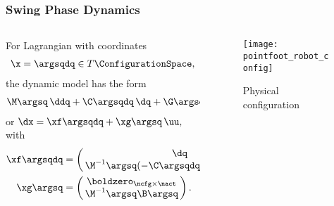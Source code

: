\begin{frame}[t]

  \frametitle{Swing Phase Dynamics}
  \begin{columns}
    \begin{column}{.55\textwidth}
      For Lagrangian \Lagrangian with coordinates
      \begin{align*}
        \x = \argsqdq \in T\ConfigurationSpace,
      \end{align*}
      the dynamic model has the form
      \begin{align*}
        \M\argsq \, \ddq + \C\argsqdq \, \dq + \G\argsq = \B\argsq \, \uu,
      \end{align*}
      or $\dx = \xf\argsqdq+ \xg\argsq \, \uu,$ with
      \begin{align*}
        \xf\argsqdq &= \left(\!\!\begin{array}{c}
            \dq\\
            \M^{-1}\argsq (-\C\argsqdq \, \dq - \G\argsq)
          \end{array}\!\!\right),\\
        \xg\argsq &= \left(\!\!\begin{array}{c}
            \boldzero_{\ncfg \times \nact}\\
            \M^{-1}\argsq \B\argsq
          \end{array}\!\!\right).
      \end{align*}
    \end{column}\!\!
    \begin{column}{.45\textwidth}
      \begin{figure}
        \centering
        \vspace{-10mm}
        \caption{Physical configuration}
        \texttt{[image: pointfoot\_robot\_config]}
      \end{figure}
    \end{column}
  \end{columns}
\end{frame}

